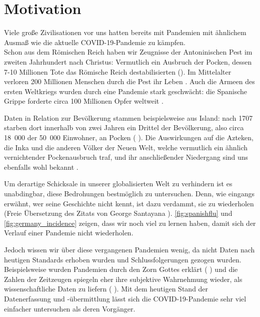 \chapter{Motivation}\label{chap:Motivation}
Viele große Zivilisationen vor uns hatten bereits mit Pandemien mit ähnlichem Ausmaß wie die aktuelle COVID-19-Pandemie zu kämpfen.\\
Schon aus dem Römischen Reich haben wir Zeugnisse der Antoninischen Pest im zweiten Jahrhundert nach Christus: Vermutlich ein Ausbruch der Pocken, dessen 7-10 Millionen Tote das Römische Reich destabilisierten (\autocite{RomPest}).%
Im Mittelalter verloren 200 Millionen Menschen durch die Pest ihr Leben \autocite{PestMittelalter}.
Auch die Armeen des ersten Weltkriegs wurden durch eine Pandemie stark geschwächt: die Spanische Grippe forderte circa 100 Millionen Opfer weltweit \autocite{SpanischeGrippe}.

Daten in Relation zur Bevölkerung stammen beispielsweise aus Island: nach 1707 starben dort innerhalb von zwei Jahren ein Drittel der Bevölkerung, also circa  18~000 der 50~000 Einwohner, an Pocken (\autocite{americaPandemics}%
). Die Auswirkungen auf die Azteken, die Inka und die anderen Völker der Neuen Welt, welche vermutlich ein ähnlich vernichtender Pockenausbruch traf, und ihr anschließender Niedergang sind uns ebenfalls wohl bekannt \autocite{americaPandemics}.

Um derartige Schicksale in unserer globalisierten Welt zu verhindern ist es unabdingbar, diese Bedrohungen bestmöglich zu untersuchen. Denn, wie eingangs erwähnt, \glqq{}wer seine Geschichte nicht kennt, ist dazu verdammt, sie zu wiederholen\grqq{} (Freie Übersetzung des Zitats von George Santayana \autocite{history-quoteSantayana}).
\autoref{fig:spanishflu} und \autoref{fig:germany_incidence} zeigen, dass wir noch viel zu lernen haben, damit sich der Verlauf einer Pandemie nicht wiederholen.


Jedoch wissen wir über diese vergangenen Pandemien wenig, da nicht Daten nach heutigen Standards erhoben wurden und Schlussfolgerungen gezogen wurden. Beispielsweise wurden Pandemien durch den Zorn Gottes erklärt (\autocite{americaPandemics}%
) und die Zahlen der Zeitzeugen spiegeln eher ihre subjektive Wahrnehmung wieder, als wissenschaftliche Daten zu liefern (\autocite{americaPandemics}%
). Mit dem heutigen Stand der Datenerfassung und -übermittlung lässt sich die COVID-19-Pandemie sehr viel einfacher untersuchen als deren Vorgänger.

